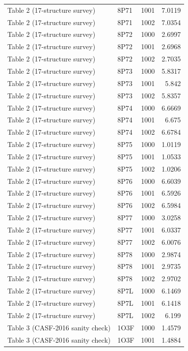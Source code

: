 \begin{longtable}{llrr}
Table 2 (17-structure survey) & 8P71 & 1001 & 7.0119 \\
Table 2 (17-structure survey) & 8P71 & 1002 & 7.0354 \\
Table 2 (17-structure survey) & 8P72 & 1000 & 2.6997 \\
Table 2 (17-structure survey) & 8P72 & 1001 & 2.6968 \\
Table 2 (17-structure survey) & 8P72 & 1002 & 2.7035 \\
Table 2 (17-structure survey) & 8P73 & 1000 & 5.8317 \\
Table 2 (17-structure survey) & 8P73 & 1001 & 5.842 \\
Table 2 (17-structure survey) & 8P73 & 1002 & 5.8357 \\
Table 2 (17-structure survey) & 8P74 & 1000 & 6.6669 \\
Table 2 (17-structure survey) & 8P74 & 1001 & 6.675 \\
Table 2 (17-structure survey) & 8P74 & 1002 & 6.6784 \\
Table 2 (17-structure survey) & 8P75 & 1000 & 1.0119 \\
Table 2 (17-structure survey) & 8P75 & 1001 & 1.0533 \\
Table 2 (17-structure survey) & 8P75 & 1002 & 1.0206 \\
Table 2 (17-structure survey) & 8P76 & 1000 & 6.6039 \\
Table 2 (17-structure survey) & 8P76 & 1001 & 6.5926 \\
Table 2 (17-structure survey) & 8P76 & 1002 & 6.5984 \\
Table 2 (17-structure survey) & 8P77 & 1000 & 3.0258 \\
Table 2 (17-structure survey) & 8P77 & 1001 & 6.0337 \\
Table 2 (17-structure survey) & 8P77 & 1002 & 6.0076 \\
Table 2 (17-structure survey) & 8P78 & 1000 & 2.9874 \\
Table 2 (17-structure survey) & 8P78 & 1001 & 2.9735 \\
Table 2 (17-structure survey) & 8P78 & 1002 & 2.9702 \\
Table 2 (17-structure survey) & 8P7L & 1000 & 6.1469 \\
Table 2 (17-structure survey) & 8P7L & 1001 & 6.1418 \\
Table 2 (17-structure survey) & 8P7L & 1002 & 6.199 \\
Table 3 (CASF-2016 sanity check) & 1O3F & 1000 & 1.4579 \\
Table 3 (CASF-2016 sanity check) & 1O3F & 1001 & 1.4884 \\

\end{longtable}
